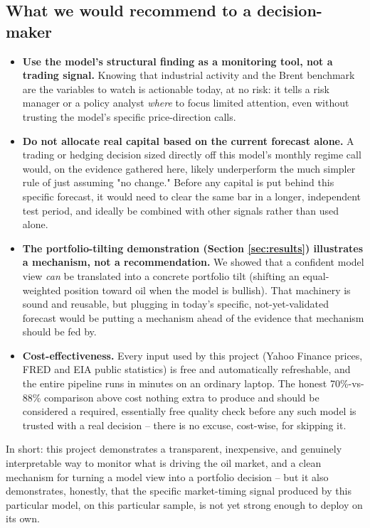 \subsection{What we would recommend to a decision-maker}

\begin{itemize}
  \item \textbf{Use the model's structural finding as a monitoring
    tool, not a trading signal.} Knowing that industrial activity and
    the Brent benchmark are the variables to watch is actionable today,
    at no risk: it tells a risk manager or a policy analyst \emph{where}
    to focus limited attention, even without trusting the model's
    specific price-direction calls.
  \item \textbf{Do not allocate real capital based on the current
    forecast alone.} A trading or hedging decision sized directly off
    this model's monthly regime call would, on the evidence gathered
    here, likely underperform the much simpler rule of just assuming
    "no change." Before any capital is put behind this specific
    forecast, it would need to clear the same bar in a longer,
    independent test period, and ideally be combined with other signals
    rather than used alone.
  \item \textbf{The portfolio-tilting demonstration (Section
    \ref{sec:results}) illustrates a mechanism, not a recommendation.}
    We showed that a confident model view \emph{can} be translated into
    a concrete portfolio tilt (shifting an equal-weighted position
    toward oil when the model is bullish). That machinery is sound and
    reusable, but plugging in today's specific, not-yet-validated
    forecast would be putting a mechanism ahead of the evidence that
    mechanism should be fed by.
  \item \textbf{Cost-effectiveness.} Every input used by this project
    (Yahoo Finance prices, FRED and EIA public statistics) is free and
    automatically refreshable, and the entire pipeline runs in minutes
    on an ordinary laptop. The honest 70\%-vs-88\% comparison above cost
    nothing extra to produce and should be considered a required,
    essentially free quality check before any such model is trusted with
    a real decision -- there is no excuse, cost-wise, for skipping it.
\end{itemize}

In short: this project demonstrates a transparent, inexpensive, and
genuinely interpretable way to monitor what is driving the oil market,
and a clean mechanism for turning a model view into a portfolio
decision -- but it also demonstrates, honestly, that the specific
market-timing signal produced by this particular model, on this
particular sample, is not yet strong enough to deploy on its own.
